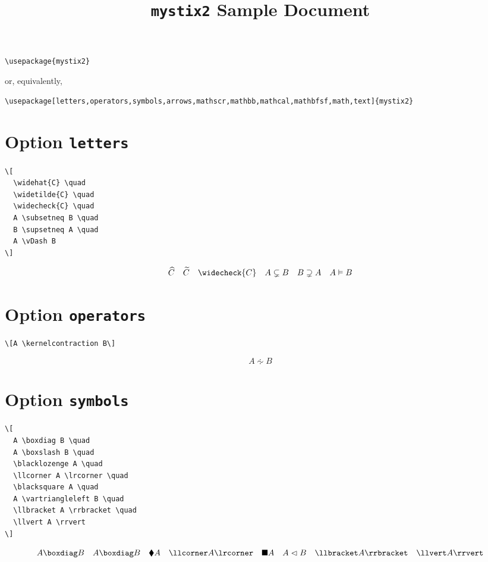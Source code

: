 \documentclass{article}
\begin{document}
\title{\texttt{mystix2} Sample Document}
\author{}
\date{}

\maketitle

\begin{verbatim}
\usepackage{mystix2}
\end{verbatim}
%
or, equivalently,
%
\begin{verbatim}
\usepackage[letters,operators,symbols,arrows,mathscr,mathbb,mathcal,mathbfsf,math,text]{mystix2}
\end{verbatim}

\section{Option \texttt{letters}}

\begin{verbatim}
\[
  \widehat{C} \quad
  \widetilde{C} \quad
  \widecheck{C} \quad
  A \subsetneq B \quad
  B \supsetneq A \quad
  A \vDash B
\]
\end{verbatim}
%
\[
  \widehat{C} \quad
  \widetilde{C} \quad
  \widecheck{C} \quad
  A \subsetneq B \quad
  B \supsetneq A \quad
  A \vDash B
\]

\section{Option \texttt{operators}}

\begin{verbatim}
\[A \kernelcontraction B\]
\end{verbatim}
%
\[A \kernelcontraction B\]

\section{Option \texttt{symbols}}

\begin{verbatim}
\[
  A \boxdiag B \quad
  A \boxslash B \quad
  \blacklozenge A \quad
  \llcorner A \lrcorner \quad
  \blacksquare A \quad
  A \vartriangleleft B \quad
  \llbracket A \rrbracket \quad
  \llvert A \rrvert
\]
\end{verbatim}
%
\[
  A \boxdiag B \quad
  A \boxslash B \quad
  \blacklozenge A \quad
  \llcorner A \lrcorner \quad
  \blacksquare A \quad
  A \vartriangleleft B \quad
  \llbracket A \rrbracket \quad
  \llvert A \rrvert
\]
\end{document}
